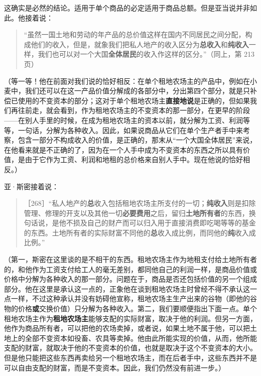 这确实是必然的结论。适用于单个商品的必定适用于商品总额。但是亚当说并非如此。他接着说：

\begin{quote}“虽然一国土地和劳动的年产品的总价值这样在国内不同居民之间分配，构成他们的收入，但是，就象我们把私人地产的收入区分为\textbf{总收入}和\textbf{纯收入}一样，我们也可以对一个大国\textbf{全体居民}的收入作这样的区分。”（同上，第 213 页）\end{quote}

（等一等！他在前面对我们说的恰好相反：在单个租地农场主的产品中，例如在小麦中，我们还可以在这一产品价值分解成的各部分中，分出第四个部分，就是只补偿已使用的不变资本的部分；这对于单个租地农场主\textbf{直接地说}是正确的，但如果我们再往前走，就会看到，作为租地农场主的不变资本的那一部分，在更早的阶段——在别人手里的时候，在成为租地农场主的资本以前，就分解为工资、利润等等，一句话，分解为各种收入。因此，如果说商品从它们在单个生产者手中来考察，包含一部分不构成收入的价值，是正确的，那末从“一个大国全体居民”来说，在他看来就是不正确的了，因为在一个人手中成为不变资本的东西之所以具有价值，是由于它作为工资、利润和地租的总价格来自别人手中。现在他说的恰好相反。）

亚·斯密接着说：

\begin{quote}［268］“私人地产的\textbf{总}收入包括租地农场主所支付的一切；\textbf{纯收入}则是扣除管理、修理的开支以及其他一切\textbf{必要费用}之后，留归\textbf{土地所有者}的东西，换句话说，是他不损及自己的财产而可以归入用于直接消费即吃喝等等的基金的东西。土地所有者的实际财富不同他的\textbf{总}收入成比例，而同他的\textbf{纯}收入成比例。”\end{quote}

（第一，斯密在这里谈的是不相干的东西。租地农场主作为地租支付给土地所有者的，和他作为工资支付给工人的毫无差别，都同他自己的利润一样，是商品价值或价格中分解为各种收入的那一部分。问题在于，商品是否还包括价值的另一个组成部分。他在这里是承认这一点的，正象他在谈到租地农场主时曾经不得不承认这一点一样，不过这种承认并没有妨碍他宣称，租地农场主生产出来的谷物（即他的谷物的价格\textbf{或}交换价值）只分解为各种收入。第二，我们要顺便指出下面一点。单个租地农场主作为\textbf{租地农场主}能够支配的实际财富，取决于他的利润。但另一方面，他作为商品所有者，可以把他的农场卖掉，或者说，如果土地不属于他，可以把土地上的全部不变资本如役畜、农具等卖掉。他由此所能实现的价值，从而，他所能支配的财富，就取决于他的不变资本的价值，也就是取决于这个不变资本的大小。但是他只能把这些东西再卖给另一个租地农场主，而在后者手中，这些东西并不是可以自由支配的财富，而是不变资本。因此，我们仍然没有前进一步。）

